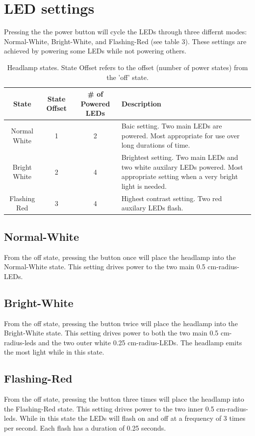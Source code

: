 \documentclass[12pt]{article}
\begin{document}
\section{LED settings}
Pressing the the power button will cycle the LEDs through three differnt modes: Normal-White,
Bright-White, and Flashing-Red (see table 3). These settings are achieved by powering some LEDs while not
powering others.

\begin{table}
\begin{center}
\begin{tabular}{ | c | c | c | p{5cm} |}
    \hline
    State & State Offset & \# of Powered LEDs & Description \\ \hline
    Normal White & 1 & 2 &  Baic setting. Two main LEDs are powered. Most appropriate for use over
    long durations of time.\\ \hline
    Bright White & 2 & 4 &  Brightest setting. Two main LEDs and two white auxilary LEDs powered.
    Most appropriate setting when a very bright light is needed.\\ \hline
    Flashing Red & 3 & 4 &  Highest contrast setting. Two red auxilary LEDs flash.\\ \hline
\end{tabular}
\end{center}
\caption[Lamp Power States] {Headlamp states. State Offset refers to the offset (number of power
states) from the 'off' state.}
\end{table}

\subsection{Normal-White}
From the off state, pressing the button once will place the headlamp into the Normal-White state.  This
setting drives power to the two main 0.5 cm-radius-LEDs.

\subsection{Bright-White}
From the off state, pressing the button twice will place the headlamp into the Bright-White state.
This setting drives power to both the two main 0.5 cm-radius-leds and the two outer white 0.25
cm-radius-LEDs. The headlamp emits the most light while in this state.

\subsection{Flashing-Red}
From the off state, pressing the button three times will place the headlamp into the Flashing-Red state.
This setting drives power to the two inner 0.5 cm-radius-leds. While in this state the
LEDs will flash on and off at a frequency of 3 times per second. Each flash has a duration of
0.25 seconds.
\end{document}

